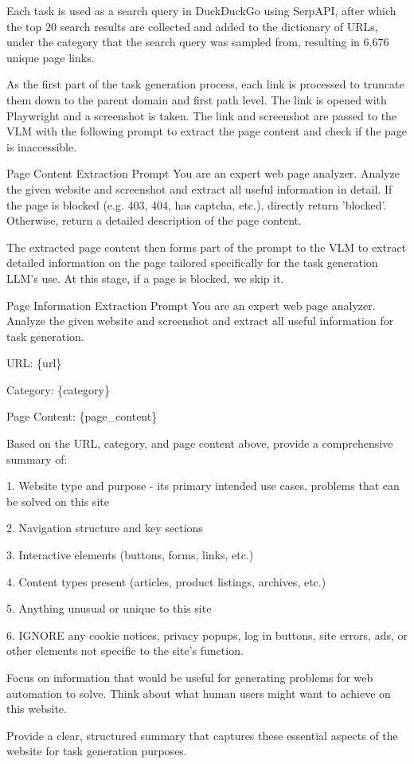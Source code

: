 \documentclass{article} %
\begin{document}
Each task is used as a search query in DuckDuckGo using SerpAPI, after which the top 20 search results are collected and added to the dictionary of URLs, under the category that the search query was sampled from, resulting in 6,676 unique page links.

As the first part of the task generation process, each link is processed to truncate them down to the parent domain and first path level. The link is opened with Playwright and a screenshot is taken. The link and screenshot are passed to the VLM with the following prompt to extract the page content and check if the page is inaccessible.

\begin{fancybox} {Page Content Extraction Prompt}
You are an expert web page analyzer. Analyze the given website and screenshot and extract all useful information in detail. If the page is blocked (e.g. 403, 404, has captcha, etc.), directly return 'blocked'. Otherwise, return a detailed description of the page content.
\end{fancybox}

The extracted page content then forms part of the prompt to the VLM to extract detailed information on the page tailored specifically for the task generation LLM's use. At this stage, if a page is blocked, we skip it.

\begin{fancybox}{Page Information Extraction Prompt}
You are an expert web page analyzer. Analyze the given website and screenshot and extract all useful information for task generation.
\bigskip

URL: \{url\}

Category: \{category\}

Page Content: \{page\_content\}

\bigskip
Based on the URL, category, and page content above, provide a comprehensive summary of:

1. Website type and purpose - its primary intended use cases, problems that can be solved on this site

2. Navigation structure and key sections

3. Interactive elements (buttons, forms, links, etc.)

4. Content types present (articles, product listings, archives, etc.)

5. Anything unusual or unique to this site

6. IGNORE any cookie notices, privacy popups, log in buttons, site errors, ads, or other elements not specific to the site's function.

\bigskip
Focus on information that would be useful for generating problems for web automation to solve. Think about what human users might want to achieve on this website.

Provide a clear, structured summary that captures these essential aspects of the website for task generation purposes.
\end{fancybox}
\end{document}
